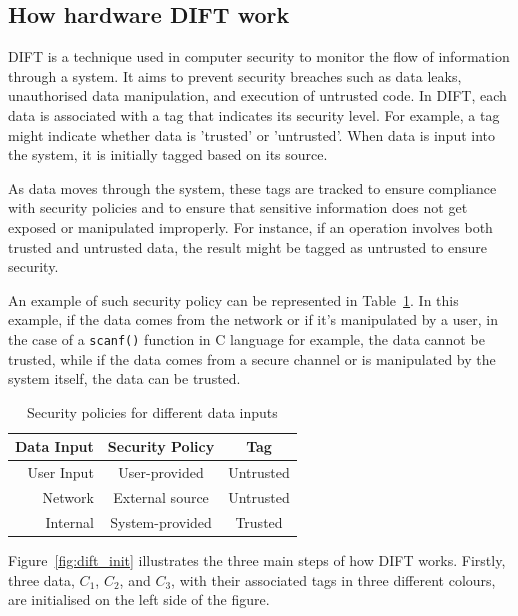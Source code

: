 \subsection{How hardware DIFT work}
DIFT is a technique used in computer security to monitor the flow of information through a system. It aims to prevent security breaches such as data leaks, unauthorised data manipulation, and execution of untrusted code. In DIFT, each data is associated with a tag that indicates its security level.
For example, a tag might indicate whether data is 'trusted' or 'untrusted'. When data is input into the system, it is initially tagged based on its source.

As data moves through the system, these tags are tracked to ensure compliance with security policies and to ensure that sensitive information does not get exposed or manipulated improperly. For instance, if an operation involves both trusted and untrusted data, the result might be tagged as untrusted to ensure security.

An example of such security policy can be represented in Table~\ref{table:security_policies}. In this example, if the data comes from the network or if it's manipulated by a user, in the case of a \verb|scanf()| function in C language for example, the data cannot be trusted, while if the data comes from a secure channel or is manipulated by the system itself, the data can be trusted.

\begin{table}[h]
    \centering
    \caption{Security policies for different data inputs}
    \label{table:security_policies}
    \begin{tabular}{@{}rcc@{}}
        \toprule
        \textbf{Data Input} & \textbf{Security Policy} & \textbf{Tag}     \\ \midrule
        User Input          & User-provided            & Untrusted        \\ \hline
        Network             & External source          & Untrusted        \\ \hline
        Internal            & System-provided          & Trusted          \\
        \bottomrule
    \end{tabular}
\end{table}

Figure~\ref{fig:dift_init} illustrates the three main steps of how DIFT works. Firstly, three data, $C_1$, $C_2$, and $C_3$, with their associated tags in three different colours, are initialised on the left side of the figure.


